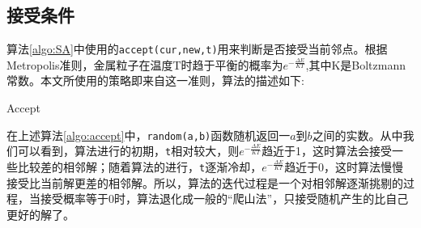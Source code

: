 \subsection*{接受条件}
\label{sec:accept}
算法\ref{algo:SA}中使用的\texttt{accept(cur,new,t)}用来判断是否接受当前邻点。根据Metropolis准则，金属粒子在温度T时趋于平衡的概率为$e^{-\frac{\Delta E}{KT}}$,其中K是Boltzmann常数。本文所使用的策略即来自这一准则，算法的描述如下:
\begin{algorithm}[H]
  \DontPrintSemicolon
  
  \caption{Accept\label{algo:accept}}
\end{algorithm}

在上述算法\ref{algo:accept}中，\texttt{random(a,b)}函数随机返回一$a$到$b$之间的实数。从中我们可以看到，算法进行的初期，\texttt{t}相对较大，则$e^{-\frac{\Delta E}{KT}}$趋近于1，这时算法会接受一些比较差的相邻解；随着算法的进行，\texttt{t}逐渐冷却，$e^{-\frac{\Delta E}{KT}}$趋近于0，这时算法慢慢接受比当前解更差的相邻解。所以，算法的迭代过程是一个对相邻解逐渐挑剔的过程，当接受概率等于0时，算法退化成一般的``爬山法''，只接受随机产生的比自己更好的解了。

